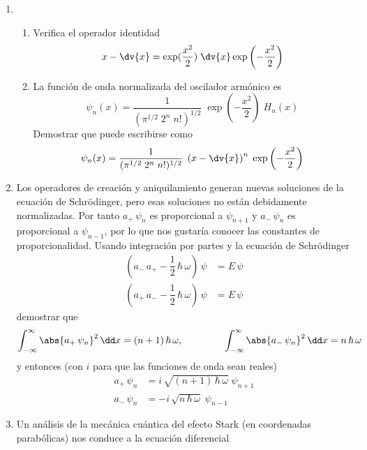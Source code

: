 \begin{enumerate}
\item \begin{enumerate}[label=\alph{*})]
\item Verifica el operador identidad
\[ x - \dv{x} = \exp(\dfrac{x^{2}}{2}) \; \dv{x} \exp \left(- \dfrac{x^{2}}{2} \right) \]
\item La función de onda normalizada del oscilador armónico es
\[ \psi_{n} (x) = \dfrac{1}{(\pi^{1/2} \; 2^{n} \; n!)^{1/2}} \; \exp \left(- \dfrac{x^{2}}{2} \right) \; H_{n}(x) \]
Demostrar que puede escribirse como
\[ \psi_{n} (x) = \dfrac{1}{(\pi^{1/2} \; 2^{n} \; n!)^{1/2}} \; \left( x - \dv{x} \right)^{n} \; \exp \left(- \dfrac{x^{2}}{2} \right) \]
\end{enumerate}
\item Los operadores de creación y aniquilamiento generan nuevas soluciones de la ecuación de Schrödinger, pero esas soluciones no están debidamente normalizadas. Por tanto $a_{+} \, \psi_{n}$ es proporcional a $\psi_{n+1}$ y $a_{-} \, \psi_{n}$ es proporcional a $\psi_{n-1}$, por lo que nos gustaría conocer las constantes de proporcionalidad. Usando integración por partes y la ecuación de Schrödinger
\begin{align*}
(a_{-} \, a_{+} - \dfrac{1}{2} \, \hbar \, \omega) \, \psi &= E \, \psi \\
(a_{+} \, a_{-} - \dfrac{1}{2} \, \hbar \, \omega) \, \psi &= E \, \psi 
\end{align*}
demostrar que
\[ \int_{-\infty}^{\infty} \abs{a_{+} \, \psi_{n}}^{2} \, \dd x = (n+1) \, \hbar \, \omega, \hspace{1.5cm} \int_{-\infty}^{\infty} \abs{a_{-} \, \psi_{n}}^{2} \, \dd x = n \, \hbar \, \omega \]
y entonces (con $i$ para que las funciones de onda sean reales)
\begin{align*}
a_{+} \, \psi_{n} &= i \, \sqrt{(n+1) \, \hbar \, \omega} \; \psi_{n+1} \\
a_{-} \, \psi_{n} &= -i \, \sqrt{n \, \hbar \, \omega} \; \psi_{n-1}
\end{align*}
\item Un análisis de la mecánica cuántica del efecto Stark (en coordenadas parabólicas) nos conduce a la ecuación diferencial

\end{enumerate}
